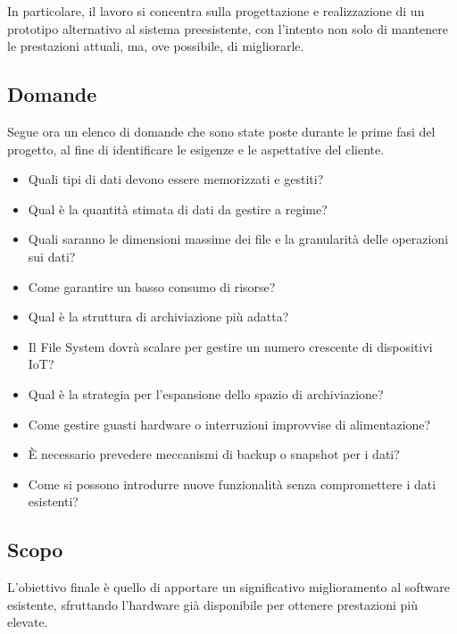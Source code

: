 \documentclass[12pt,a4paper,openright,twoside]{book}
\begin{document}
        In particolare, il lavoro si concentra sulla progettazione e realizzazione di un prototipo alternativo al sistema preesistente, con l'intento non solo di mantenere le prestazioni attuali, ma, ove possibile, di migliorarle.

        \subsection{Domande}
        \label{subsec:Domande}

            Segue ora un elenco di domande che sono state poste durante le prime fasi del progetto, al fine di identificare le esigenze e le aspettative del cliente.

            \begin{itemize}
                \item Quali tipi di dati devono essere memorizzati e gestiti?
                \item Qual è la quantità stimata di dati da gestire a regime?
                \item Quali saranno le dimensioni massime dei file e la granularità delle operazioni sui dati?
                \item Come garantire un basso consumo di risorse?
                \item Qual è la struttura di archiviazione più adatta?
                \item Il File System dovrà scalare per gestire un numero crescente di dispositivi IoT?
                \item Qual è la strategia per l'espansione dello spazio di archiviazione?
                \item Come gestire guasti hardware o interruzioni improvvise di alimentazione?
                \item È necessario prevedere meccanismi di backup o snapshot per i dati?
                \item Come si possono introdurre nuove funzionalità senza compromettere i dati esistenti?
            \end{itemize}

        \subsection{Scopo}

            L’obiettivo finale è quello di apportare un significativo miglioramento al software esistente, sfruttando l’hardware già disponibile per ottenere prestazioni più elevate.
\end{document}
